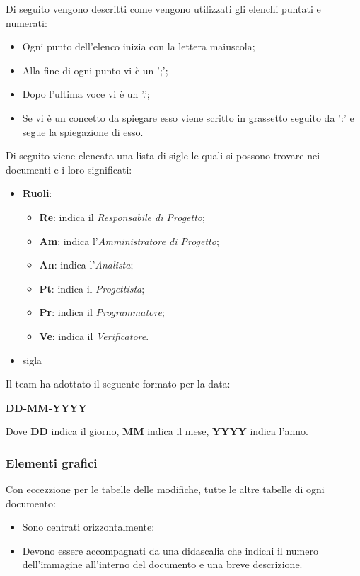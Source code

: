 Di seguito vengono descritti come vengono utilizzati gli elenchi puntati e numerati:
\begin {itemize}
\item Ogni punto dell'elenco inizia con la lettera maiuscola;
\item Alla fine di ogni punto vi è un ';';
\item Dopo l'ultima voce vi è un '.';
\item Se vi è un concetto da spiegare esso viene scritto in grassetto seguito da ':' e segue la spiegazione di esso.
\end {itemize}

Di seguito viene elencata una lista di sigle le quali si possono trovare nei documenti e i loro significati:
\begin {itemize}
\item \textbf{Ruoli}:
	\begin {itemize}
	\item \textbf{Re}: indica il \textit{Responsabile di Progetto};
	\item \textbf{Am}: indica l’\textit{Amministratore di Progetto};
	\item \textbf{An}: indica l’\textit{Analista};
	\item \textbf{Pt}: indica il \textit{Progettista};
	\item \textbf{Pr}: indica il \textit{Programmatore};
	\item \textbf{Ve}: indica il \textit{Verificatore}.
	\end {itemize}
\item sigla
\end {itemize}
Il team ha adottato il seguente formato per la data:
\begin{center}
    \large{\textbf{DD-MM-YYYY}}
\end{center}
Dove \textbf{DD} indica il giorno, \textbf{MM} indica il mese, \textbf{YYYY} indica l'anno.

\subsubsection{Elementi grafici}

Con eccezzione per le tabelle delle modifiche, tutte le altre tabelle di ogni documento:
\begin {itemize}
\item Sono centrati orizzontalmente:
\item Devono essere accompagnati da una didascalia che indichi il numero dell'immagine all'interno del documento e una breve descrizione.
\end {itemize}


